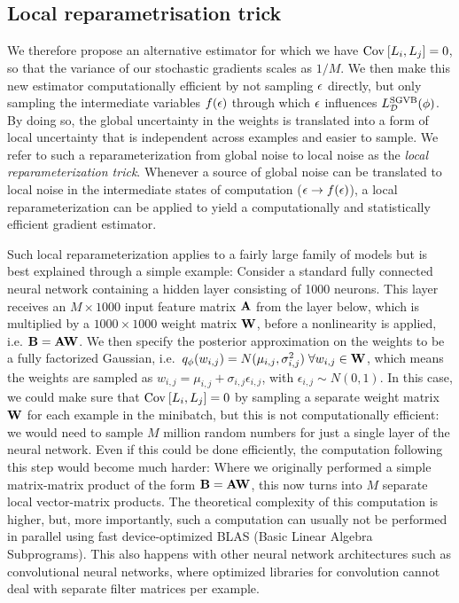 \subsection{Local  reparametrisation  trick}

We therefore propose an alternative estimator for which we have $\text{Cov}_{}\left[L_{i},L_{j}\right] = 0$, so that the variance of our stochastic gradients scales as $1/M$. We then make this new estimator computationally efficient by not sampling $\mathbf{\epsilon}$ directly, but only sampling the intermediate variables $f(\mathbf{\epsilon})$ through which $\mathbf{\epsilon}$ influences $L_{\mathcal{D}}^\text{SGVB}(\mathbf{\phi})$. By doing so, the global uncertainty in the weights is translated into a form of local uncertainty that is independent across examples and easier to sample. We refer to such a reparameterization from global noise to local noise as the \emph{local reparameterization trick}. Whenever a source of global noise can be translated to local noise in the intermediate states of computation ($\mathbf{\epsilon} \rightarrow f(\mathbf{\epsilon})$), a local reparameterization can be applied to yield a computationally and statistically efficient gradient estimator.

Such local reparameterization applies to a fairly large family of models but is best explained through a simple example: Consider a standard fully connected neural network containing a hidden layer consisting of 1000 neurons. This layer receives an $M \times 1000$ input feature matrix $\mathbf{A}$ from the layer below, which is multiplied by a $1000 \times 1000$ weight matrix $\mathbf{W}$, before a nonlinearity is applied, i.e. $\mathbf{B} = \mathbf{A}\mathbf{W}$. We then specify the posterior approximation on the weights to be a fully factorized Gaussian, i.e.\ $q_\mathbf{\phi}(w_{i,j}) = N(\mu_{i,j},\sigma^{2}_{i,j}) \hspace{0.1cm} \forall w_{i,j} \in \mathbf{W}$, which means the weights are sampled as $w_{i,j} = \mu_{i,j} + \sigma_{i,j}\epsilon_{i,j}$, with $\epsilon_{i,j} \sim N(0,1)$. In this case, we could make sure that $\text{Cov}_{}\left[L_{i},L_{j}\right] = 0$ by sampling a separate weight matrix $\mathbf{W}$ for each example in the minibatch, but this is not computationally efficient: we would need to sample $M$ million random numbers for just a single layer of the neural network. Even if this could be done efficiently, the computation following this step would become much harder: Where we originally performed a simple matrix-matrix product of the form $\mathbf{B} = \mathbf{A}\mathbf{W}$, this now turns into $M$ separate local vector-matrix products. The theoretical complexity of this computation is higher, but, more importantly, such a computation can usually not be performed in parallel using fast device-optimized BLAS (Basic Linear Algebra Subprograms). This also happens with other neural network architectures such as convolutional neural networks, where optimized libraries for convolution cannot deal with separate filter matrices per example.

